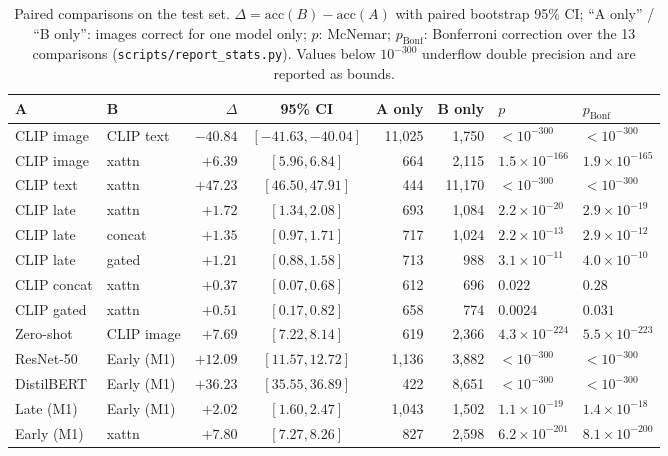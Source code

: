 \documentclass[11pt,a4paper]{article}
\begin{document}
\begin{table}[!htbp]
\centering
\caption{Paired comparisons on the test set. $\Delta = \mathrm{acc}(B)-\mathrm{acc}(A)$ with paired bootstrap
95\% CI; ``A only'' / ``B only'': images correct for one model only; $p$: McNemar; $p_{\text{Bonf}}$: Bonferroni
correction over the 13 comparisons (\texttt{scripts/report\_stats.py}). Values below $10^{-300}$ underflow double
precision and are reported as bounds.}
\label{tab:sig}
\small
\setlength{\tabcolsep}{4pt}
\begin{tabular}{llrcrrll}
\toprule
A & B & $\Delta$ & 95\% CI & A only & B only & $p$ & $p_{\text{Bonf}}$ \\
\midrule
CLIP image & CLIP text & $-40.84$ & $[-41.63, -40.04]$ & 11,025 & 1,750 & $<10^{-300}$ & $<10^{-300}$ \\
CLIP image & xattn & $+6.39$ & $[5.96, 6.84]$ & 664 & 2,115 & $1.5\times10^{-166}$ & $1.9\times10^{-165}$ \\
CLIP text & xattn & $+47.23$ & $[46.50, 47.91]$ & 444 & 11,170 & $<10^{-300}$ & $<10^{-300}$ \\
CLIP late & xattn & $+1.72$ & $[1.34, 2.08]$ & 693 & 1,084 & $2.2\times10^{-20}$ & $2.9\times10^{-19}$ \\
CLIP late & concat & $+1.35$ & $[0.97, 1.71]$ & 717 & 1,024 & $2.2\times10^{-13}$ & $2.9\times10^{-12}$ \\
CLIP late & gated & $+1.21$ & $[0.88, 1.58]$ & 713 & 988 & $3.1\times10^{-11}$ & $4.0\times10^{-10}$ \\
CLIP concat & xattn & $+0.37$ & $[0.07, 0.68]$ & 612 & 696 & $0.022$ & $0.28$ \\
CLIP gated & xattn & $+0.51$ & $[0.17, 0.82]$ & 658 & 774 & $0.0024$ & $0.031$ \\
Zero-shot & CLIP image & $+7.69$ & $[7.22, 8.14]$ & 619 & 2,366 & $4.3\times10^{-224}$ & $5.5\times10^{-223}$ \\
ResNet-50 & Early (M1) & $+12.09$ & $[11.57, 12.72]$ & 1,136 & 3,882 & $<10^{-300}$ & $<10^{-300}$ \\
DistilBERT & Early (M1) & $+36.23$ & $[35.55, 36.89]$ & 422 & 8,651 & $<10^{-300}$ & $<10^{-300}$ \\
Late (M1) & Early (M1) & $+2.02$ & $[1.60, 2.47]$ & 1,043 & 1,502 & $1.1\times10^{-19}$ & $1.4\times10^{-18}$ \\
Early (M1) & xattn & $+7.80$ & $[7.27, 8.26]$ & 827 & 2,598 & $6.2\times10^{-201}$ & $8.1\times10^{-200}$ \\
\bottomrule
\end{tabular}
\end{table}
\end{document}
